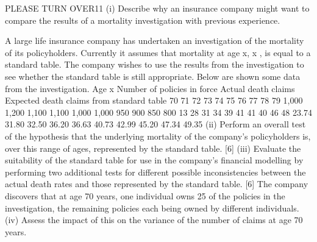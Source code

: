 PLEASE TURN OVER11
(i)
Describe why an insurance company might want to compare the results of a
mortality investigation with previous experience.

A large life insurance company has undertaken an investigation of the mortality of its
policyholders. Currently it assumes that mortality at age x, \mu x , is equal to a standard
table. The company wishes to use the results from the investigation to see whether
the standard table is still appropriate. Below are shown some data from the
investigation.
Age x Number of
policies in force Actual death
claims Expected death
claims from
standard table
70
71
72
73
74
75
76
77
78
79 1,000
1,200
1,100
1,100
1,000
1,000
950
900
850
800 13
28
31
34
39
41
41
40
46
48 23.74
31.80
32.50
36.20
36.63
40.73
42.99
45.20
47.34
49.35
(ii) Perform an overall test of the hypothesis that the underlying mortality of the
company’s policyholders is, over this range of ages, represented by the
standard table.
[6]
(iii) Evaluate the suitability of the standard table for use in the company’s financial
modelling by performing two additional tests for different possible
inconsistencies between the actual death rates and those represented by the
standard table.
[6]
The company discovers that at age 70 years, one individual owns 25 of the policies in
the investigation, the remaining policies each being owned by different individuals.
(iv)
Assess the impact of this on the variance of the number of claims at age 70
years.

